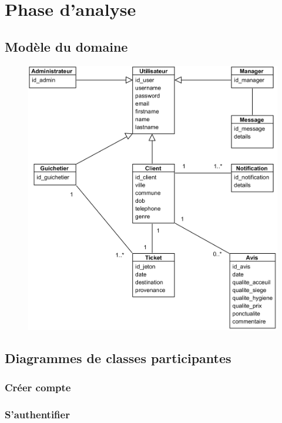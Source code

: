 \section[Phase d’analyse]{Phase d’analyse}
    \subsection[Modèle du domaine]{Modèle du domaine}
        \begin{figure}[H]
            \centering
            \includegraphics[width=130mm]{images/md-systeme.png}
            \label{fig:mdSysteme}
        \end{figure}
    \subsection[Diagrammes de classes participantes]{Diagrammes de classes participantes}
        \subsubsection[Créer compte]{Créer compte}
        \subsubsection[S’authentifier]{S’authentifier}
